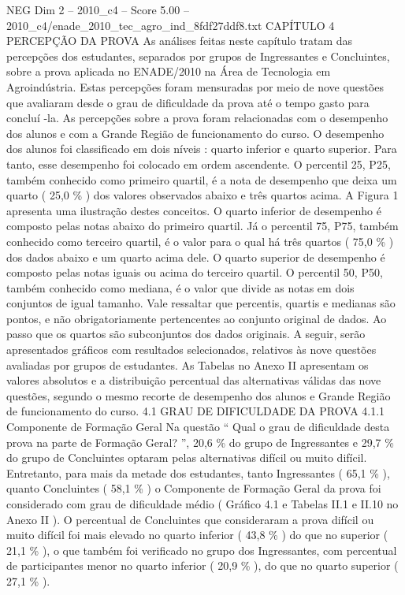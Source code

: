 \begin{textsample}{NEG Dim 2 – 2010\_c4 – Score 5.00 – 2010\_c4/enade\_2010\_tec\_agro\_ind\_8fdf27ddf8.txt}  \label{ex:f2_neg_291}
CAPÍTULO 4 PERCEPÇÃO DA PROVA As análises feitas neste capítulo tratam das percepções dos estudantes, separados por grupos de Ingressantes e Concluintes, sobre a prova aplicada no ENADE/2010 na Área de Tecnologia em Agroindústria.
Estas percepções foram mensuradas por meio de nove questões que avaliaram desde o grau de dificuldade da prova até o tempo gasto para concluí -la.
As percepções sobre a prova foram relacionadas com o desempenho dos alunos e com a Grande Região de funcionamento do curso.
O desempenho dos alunos foi classificado em dois níveis : quarto inferior e quarto superior.
Para tanto, esse desempenho foi colocado em ordem ascendente.
O percentil 25, P25, também conhecido como primeiro quartil, é a nota de desempenho que deixa um quarto ( 25,0 \% ) dos valores observados abaixo e três quartos acima.
A Figura 1 apresenta uma ilustração destes conceitos.
O quarto inferior de desempenho é composto pelas notas abaixo do primeiro quartil.
Já o percentil 75, P75, também conhecido como terceiro quartil, é o valor para o qual há três quartos ( 75,0 \% ) dos dados abaixo e um quarto acima dele.
O quarto superior de desempenho é composto pelas notas iguais ou acima do terceiro quartil.
O percentil 50, P50, também conhecido como mediana, é o valor que divide as notas em dois conjuntos de igual tamanho.
Vale ressaltar que percentis, quartis e medianas são pontos, e não obrigatoriamente pertencentes ao conjunto original de dados.
Ao passo que os quartos são subconjuntos dos dados originais.
A seguir, serão apresentados gráficos com resultados selecionados, relativos às nove questões avaliadas por grupos de estudantes.
As Tabelas no Anexo II apresentam os valores absolutos e a distribuição percentual das alternativas válidas das nove questões, segundo o mesmo recorte de desempenho dos alunos e Grande Região de funcionamento do curso. 4.1 GRAU DE DIFICULDADE DA PROVA 4.1.1 Componente de Formação Geral Na questão “ Qual o grau de dificuldade desta prova na parte de Formação Geral? ”, 20,6 \% do grupo de Ingressantes e 29,7 \% do grupo de Concluintes optaram pelas alternativas difícil ou muito difícil.
Entretanto, para mais da metade dos estudantes, tanto Ingressantes ( 65,1 \% ), quanto Concluintes ( 58,1 \% ) o Componente de Formação Geral da prova foi considerado com grau de dificuldade médio ( Gráfico 4.1 e Tabelas II.1 e II.10 no Anexo II ).
O percentual de Concluintes que consideraram a prova difícil ou muito difícil foi mais elevado no quarto inferior ( 43,8 \% ) do que no superior ( 21,1 \% ), o que também foi verificado no grupo dos Ingressantes, com percentual de participantes menor no quarto inferior ( 20,9 \% ), do que no quarto superior ( 27,1 \% ).

\end{textsample}
